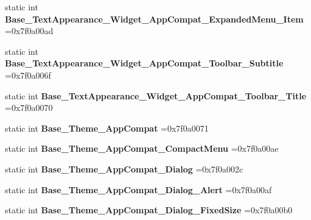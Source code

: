 \begin{DoxyCompactItemize}
static int {\bfseries Base\+\_\+\+Text\+Appearance\+\_\+\+Widget\+\_\+\+App\+Compat\+\_\+\+Expanded\+Menu\+\_\+\+Item} =0x7f0a00ad
\item 
\mbox{\label{classandroid_1_1support_1_1v4_1_1R_1_1style_a607f7274ccd08c32c11674a6f8866373}} 
static int {\bfseries Base\+\_\+\+Text\+Appearance\+\_\+\+Widget\+\_\+\+App\+Compat\+\_\+\+Toolbar\+\_\+\+Subtitle} =0x7f0a006f
\item 
\mbox{\label{classandroid_1_1support_1_1v4_1_1R_1_1style_aa642713d50d116c3f23cab03688ec217}} 
static int {\bfseries Base\+\_\+\+Text\+Appearance\+\_\+\+Widget\+\_\+\+App\+Compat\+\_\+\+Toolbar\+\_\+\+Title} =0x7f0a0070
\item 
\mbox{\label{classandroid_1_1support_1_1v4_1_1R_1_1style_a6b009bad9f33dfe04d821e4f3ab190b5}} 
static int {\bfseries Base\+\_\+\+Theme\+\_\+\+App\+Compat} =0x7f0a0071
\item 
\mbox{\label{classandroid_1_1support_1_1v4_1_1R_1_1style_a4f4a5f1e914f0cea30eeb7596a83f764}} 
static int {\bfseries Base\+\_\+\+Theme\+\_\+\+App\+Compat\+\_\+\+Compact\+Menu} =0x7f0a00ae
\item 
\mbox{\label{classandroid_1_1support_1_1v4_1_1R_1_1style_a63b0e674d9ca56dab7217d67edfd8fa1}} 
static int {\bfseries Base\+\_\+\+Theme\+\_\+\+App\+Compat\+\_\+\+Dialog} =0x7f0a002c
\item 
\mbox{\label{classandroid_1_1support_1_1v4_1_1R_1_1style_a160975bd45ef59210a9aabf102c66a61}} 
static int {\bfseries Base\+\_\+\+Theme\+\_\+\+App\+Compat\+\_\+\+Dialog\+\_\+\+Alert} =0x7f0a00af
\item 
\mbox{\label{classandroid_1_1support_1_1v4_1_1R_1_1style_ae24be226121a570816513caad0f60480}} 
static int {\bfseries Base\+\_\+\+Theme\+\_\+\+App\+Compat\+\_\+\+Dialog\+\_\+\+Fixed\+Size} =0x7f0a00b0
\item 
\mbox{\label{classandroid_1_1support_1_1v4_1_1R_1_1style_a0ded68aef8695af679ac6c7b6185be5f}} 

\end{DoxyCompactItemize}
